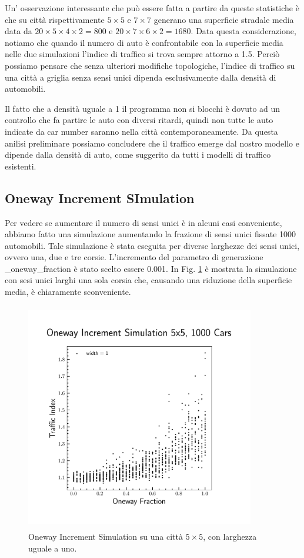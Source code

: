\documentclass[main.tex]{subfiles}
\begin{document}
        Un' osservazione interessante che può essere fatta a partire da queste statistiche è che su città rispettivamente
        $5 \times 5$ e $7 \times 7$ generano una superficie stradale media data da $20 \times 5 \times 4 \times 2 = 800$ e
        $20 \times 7 \times 6 \times 2 = 1680$. Data questa considerazione, notiamo che quando il numero di auto è confrontabile con 
        la superficie media nelle due simulazioni l'indice di traffico si trova sempre attorno a 1.5.
        Perciò possiamo pensare che senza ulteriori modifiche topologiche, l'indice di traffico su una città a griglia
        senza sensi unici dipenda esclusivamente dalla densità di automobili.

        Il fatto che a densità uguale a 1 il programma non si blocchi è dovuto ad un controllo che fa partire le auto con diversi ritardi,
        quindi non tutte le auto indicate da car number saranno nella città contemporaneamente.
        Da questa anilisi preliminare possiamo concludere che il traffico emerge dal nostro modello e dipende dalla densità di auto,
        come suggerito da tutti i modelli di traffico esistenti.

    \subsection{Oneway Increment SImulation}
        Per vedere se aumentare il numero di sensi unici è in alcuni casi conveniente, abbiamo fatto una simulazione aumentando la frazione di sensi unici 
        fissate 1000 automobili. Tale simulazione è stata eseguita per diverse larghezze dei sensi unici, ovvero una, due e tre corsie.
        L'incremento del parametro di generazione \_oneway\_fraction è stato scelto essere 0.001.
        In Fig. \ref{fig:5} è mostrata la simulazione con sesi unici larghi una sola corsia che, causando una riduzione della superficie media, è chiaramente sconveniente.
        
        \begin{figure}[H]
            \centering
            \includegraphics[width=10cm, height=10cm]{oneway_increment_1.png}  
            \caption{Oneway Increment Simulation su una città $5 \times 5$, con larghezza uguale a uno.}
            \label{fig:5}
        \end{figure}
\end{document}
